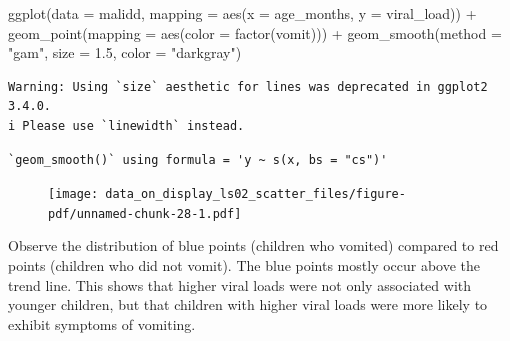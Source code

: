 \documentclass[
  letterpaper,
  DIV=11,
  numbers=noendperiod]{scrreprt}
\newenvironment{Shaded}{\begin{snugshade}}{\end{snugshade}}
\newcommand{\AttributeTok}[1]{\textcolor[rgb]{0.40,0.45,0.13}{#1}}
\newcommand{\FloatTok}[1]{\textcolor[rgb]{0.68,0.00,0.00}{#1}}
\newcommand{\FunctionTok}[1]{\textcolor[rgb]{0.28,0.35,0.67}{#1}}
\newcommand{\NormalTok}[1]{\textcolor[rgb]{0.00,0.23,0.31}{#1}}
\newcommand{\SpecialCharTok}[1]{\textcolor[rgb]{0.37,0.37,0.37}{#1}}
\newcommand{\StringTok}[1]{\textcolor[rgb]{0.13,0.47,0.30}{#1}}
\begin{document}
\begin{Shaded}
\begin{Highlighting}[]
\FunctionTok{ggplot}\NormalTok{(}\AttributeTok{data =}\NormalTok{ malidd, }
       \AttributeTok{mapping =} \FunctionTok{aes}\NormalTok{(}\AttributeTok{x =}\NormalTok{ age\_months, }
                     \AttributeTok{y =}\NormalTok{ viral\_load)) }\SpecialCharTok{+} 
  \FunctionTok{geom\_point}\NormalTok{(}\AttributeTok{mapping =} \FunctionTok{aes}\NormalTok{(}\AttributeTok{color =} \FunctionTok{factor}\NormalTok{(vomit))) }\SpecialCharTok{+}
  \FunctionTok{geom\_smooth}\NormalTok{(}\AttributeTok{method =} \StringTok{"gam"}\NormalTok{, }
              \AttributeTok{size =} \FloatTok{1.5}\NormalTok{,}
              \AttributeTok{color =} \StringTok{"darkgray"}\NormalTok{)}
\end{Highlighting}
\end{Shaded}

\begin{verbatim}
Warning: Using `size` aesthetic for lines was deprecated in ggplot2 3.4.0.
i Please use `linewidth` instead.
\end{verbatim}

\begin{verbatim}
`geom_smooth()` using formula = 'y ~ s(x, bs = "cs")'
\end{verbatim}

\begin{figure}[H]

{\centering \texttt{[image: data\_on\_display\_ls02\_scatter\_files/figure-pdf/unnamed-chunk-28-1.pdf]}

}

\end{figure}

Observe the distribution of blue points (children who vomited) compared
to red points (children who did not vomit). The blue points mostly occur
above the trend line. This shows that higher viral loads were not only
associated with younger children, but that children with higher viral
loads were more likely to exhibit symptoms of vomiting.
\end{document}
